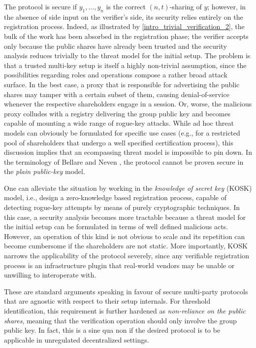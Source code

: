\documentclass{iacrtrans}
\begin{document}
\noindent
The protocol is secure
if $y_1, \dots, y_n$ is the correct $(n, t)$-sharing of $y$;
however, in the absence of side input
on the verifier's side,
its security relies entirely on the registration process.
Indeed, as illustrated by \eqref{intro_trivial_verification_2},
the bulk of the work has been
absorbed in the registration phase;
the verifier accepts only because
the public shares have already been trusted
and the security analysis
reduces trivially to the threat model for the initial setup.
The problem is that
a trusted multi-key setup is itself
a highly non-trivial assumption,
since the possibilities regarding
roles and operations
compose a rather broad attack surface.
In the best case, a proxy that is responsible
for advertising the public shares
may tamper with a certain subset of them,
causing denial-of-service whenever
the respective shareholders engage
in a session.
Or, worse, the malicious proxy colludes with
a registry delivering the group public key
and becomes capable of mounting a wide range of rogue-key attacks.
While ad hoc threat models can obviously be formulated
for specific use cases (e.g., for a restricted pool of
shareholders that undergo a well specified certification process),
this discussion implies that
an ecompassing threat model is impossible to pin down.
In the terminology of Bellare and Neven \cite{paper_bellare_musig},
the protocol cannot be proven secure
in the \textit{plain public-key} model.

One can alleviate the situation by working in the
\textit{knowledge of secret key} (KOSK) model,
i.e., design a zero-knowledge based registration process,
capable of detecting rogue-key attempts
by means of purely cryptographic techniques.
In this case, a security analysis becomes more tractable
because a threat model for the initial setup can be
formulated in terms of well defined malicious acts.
However, an operation of this kind is not obvious to scale
and its repetition can become cumbersome
if the shareholders are not static.
More importantly, KOSK narrows
the applicability of the protocol severely,
since any verifiable registration process
is an infrastructure plugin that real-world vendors
may be unable or unwilling to interoperate with.

These are standard arguments speaking in favour
of secure multi-party protocols that are agnostic
with respect to their setup internals.
For threshold identification,
this requirement is further hardened as
\textit{non-reliance on the public shares},
meaning that the verification operation should only involve
the group public key.
In fact, this is a sine qua non if the desired protocol is
to be applicable in unregulated decentralized settings.
\end{document}
